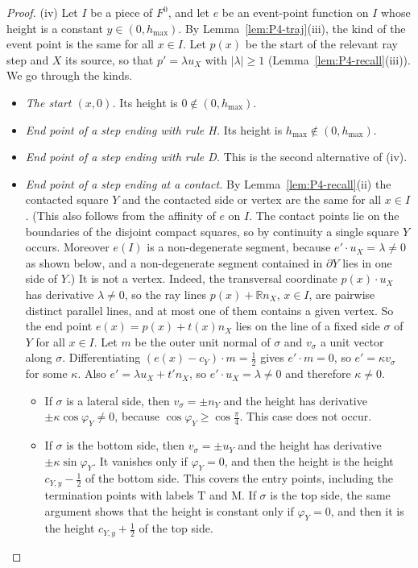 \documentclass[11pt]{amsart}
\newcommand{\R}{\mathbb R}
\newcommand{\hmax}{h_{\max}}
\newcommand{\Fz}{F^{0}}
\theoremstyle{definition}
\theoremstyle{remark}
\numberwithin{equation}{section}
\begin{document}
\begin{proof}
(iv) Let $I$ be a piece of $\Fz$, and let $e$ be an event-point function on $I$ whose height is a constant $y\in(0,\hmax)$. By Lemma~\ref{lem:P4-traj}(iii), the kind of the event point is the same for all $x\in I$. Let $p(x)$ be the start of the relevant ray step and $X$ its source, so that $p'=\lambda u_X$ with $|\lambda|\ge1$ (Lemma~\ref{lem:P4-recall}(iii)). We go through the kinds.
\begin{itemize}
\item \emph{The start $(x,0)$.} Its height is $0\notin(0,\hmax)$.
\item \emph{End point of a step ending with rule H.} Its height is $\hmax\notin(0,\hmax)$.
\item \emph{End point of a step ending with rule D.} This is the second alternative of (iv).
\item \emph{End point of a step ending at a contact.} By Lemma~\ref{lem:P4-recall}(ii) the contacted square $Y$ and the contacted side or vertex are the same for all $x\in I$. (This also follows from the affinity of $e$ on $I$. The contact points lie on the boundaries of the disjoint compact squares, so by continuity a single square $Y$ occurs. Moreover $e(I)$ is a non-degenerate segment, because $e'\cdot u_X=\lambda\ne0$ as shown below, and a non-degenerate segment contained in $\partial Y$ lies in one side of $Y$.) It is not a vertex. Indeed, the transversal coordinate $p(x)\cdot u_X$ has derivative $\lambda\ne0$, so the ray lines $p(x)+\R n_X$, $x\in I$, are pairwise distinct parallel lines, and at most one of them contains a given vertex. So the end point $e(x)=p(x)+t(x)n_X$ lies on the line of a fixed side $\sigma$ of $Y$ for all $x\in I$. Let $m$ be the outer unit normal of $\sigma$ and $v_\sigma$ a unit vector along $\sigma$. Differentiating $(e(x)-c_Y)\cdot m=\frac12$ gives $e'\cdot m=0$, so $e'=\kappa v_\sigma$ for some $\kappa$. Also $e'=\lambda u_X+t'n_X$, so $e'\cdot u_X=\lambda\ne0$ and therefore $\kappa\ne0$.
 \begin{itemize}
 \item If $\sigma$ is a lateral side, then $v_\sigma=\pm n_Y$ and the height has derivative $\pm\kappa\cos\varphi_Y\ne0$, because $\cos\varphi_Y\ge\cos\frac\pi4$. This case does not occur.
 \item If $\sigma$ is the bottom side, then $v_\sigma=\pm u_Y$ and the height has derivative $\pm\kappa\sin\varphi_Y$. It vanishes only if $\varphi_Y=0$, and then the height is the height $c_{Y,y}-\frac12$ of the bottom side. This covers the entry points, including the termination points with labels T and M. If $\sigma$ is the top side, the same argument shows that the height is constant only if $\varphi_Y=0$, and then it is the height $c_{Y,y}+\frac12$ of the top side.

\end{itemize}
\end{itemize}
\end{proof}
\end{document}
